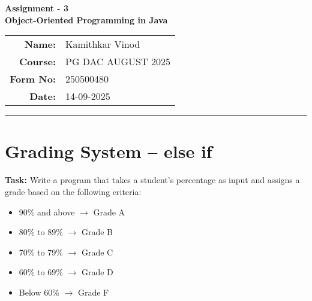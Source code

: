 \documentclass[12pt,a4paper]{article}
\begin{document}
\begin{center}
    \LARGE \textbf{Assignment - 3} \\[0.5cm]
    \Large \textbf{Object-Oriented Programming in Java} \\[1cm]

    \begin{tabular}{rl}
        \textbf{Name:} & Kamithkar Vinod \\
        \textbf{Course:} & PG DAC AUGUST 2025 \\
        \textbf{Form No:} & 250500480 \\
        \textbf{Date:} & 14-09-2025 \\
    \end{tabular}
\end{center}

\vspace{1cm}
\hrule
\vspace{0.5cm}


\section{Grading System -- else if}
\textbf{Task:} Write a program that takes a student's percentage as input and assigns a grade based on the
following criteria:
\begin{itemize}
    \item 90\% and above $\rightarrow$ Grade A
    \item 80\% to 89\% $\rightarrow$ Grade B
    \item 70\% to 79\% $\rightarrow$ Grade C
    \item 60\% to 69\% $\rightarrow$ Grade D
    \item Below 60\% $\rightarrow$ Grade F
\end{itemize}
\end{document}
